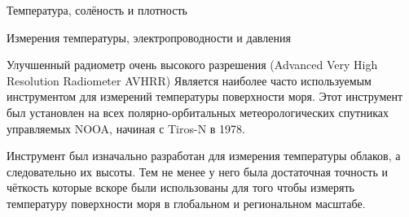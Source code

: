 \begin{chapter}{Температура, солёность и плотность}
\begin{section}{Измерения температуры, электропроводности и давления}
\begin{paragraph}{Улучшенный радиометр очень высокого разрешения (Advanced Very High Resolution Radiometer AVHRR)}
Является наиболее часто используемым инструментом для измерений
температуры поверхности моря. Этот инструмент был установлен на всех
полярно-орбитальных метеорологических спутниках управляемых NOOA,
начиная с Tiros-N в 1978.
%

Инструмент был изначально разработан для измерения температуры
облаков, а следовательно их высоты. Тем не менее у него была
достаточная точность и чёткость которые вскоре были использованы для
того чтобы измерять температуру поверхности моря в глобальном и
региональном масштабе.
%


\end{paragraph}
\end{section}
\end{chapter}
